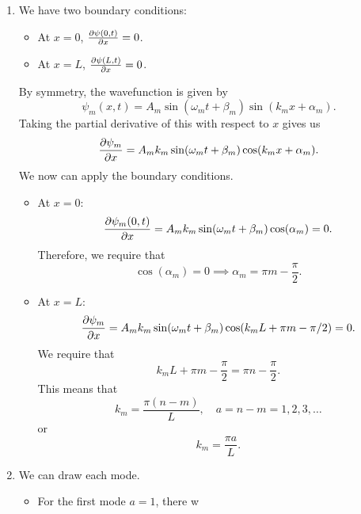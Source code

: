 \begin{sol}
\begin{enumerate}[label=\textbf{(\alph*)}]
\item We have two boundary conditions: 
\begin{itemize}
    \item At $x = 0$, $\pdv{\psi (0, t)}{x} = 0$.
    \item At $x = L$, $\pdv{\psi (L, t)}{x} = 0$.
\end{itemize}
By symmetry, the wavefunction is given by 
\[\psi_m (x, t) = A_m \sin (\omega_m t + \beta_m) \sin (k_m x + \alpha_m).\]
Taking the partial derivative of this with respect to $x$ gives us 
\[\pdv{\psi_m}{x} = A_m k_m \sin (\omega_m t + \beta_m)\cos (k_m x + \alpha_m).\]
We now can apply the boundary conditions. 
\begin{itemize}
\item At $x = 0$:
\[\pdv{\psi_m (0, t)}{x} = A_m k_m \sin (\omega_m t + \beta_m) \cos (\alpha_m) = 0.\]
Therefore, we require that 
\[\cos (\alpha_m) = 0\implies \alpha_m = \pi m - \frac{\pi}{2}.\]

\item At $x = L$:
\[\pdv{\psi_m}{x} = A_m k_m \sin (\omega_m t + \beta_m) \cos (k_m L + \pi m - \pi/2) = 0.\]
We require that 
\[k_m L + \pi m - \frac{\pi}{2} = \pi n - \frac{\pi}{2}.\]
This means that 
\[k_m = \frac{\pi (n - m)}{L}, \quad a = n - m = 1, 2, 3, \dots\]
or 
\[k_m = \frac{\pi a}{L}.\]
\end{itemize} 

\item We can draw each mode. 
\begin{itemize}
    \item For the first mode $a = 1$, there w
\end{itemize}
\end{enumerate}
\end{sol}
